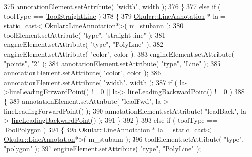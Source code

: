 \begin{DoxyCode}
375         annotationElement.setAttribute( \textcolor{stringliteral}{"width"}, width );
376     \}
377     \textcolor{keywordflow}{else} \textcolor{keywordflow}{if} ( toolType == \hyperlink{classEditAnnotToolDialog_ae4572c0cf4fc351cf03e4d86ef595a9ca28043180b87b79e0defc7b99eddb6c0d}{ToolStraightLine} )
378     \{
379         \hyperlink{classOkular_1_1LineAnnotation}{Okular::LineAnnotation} * la = \textcolor{keyword}{static\_cast<}
      \hyperlink{classOkular_1_1LineAnnotation}{Okular::LineAnnotation}*\textcolor{keyword}{>}( m\_stubann );
380         toolElement.setAttribute( \textcolor{stringliteral}{"type"}, \textcolor{stringliteral}{"straight-line"} );
381         engineElement.setAttribute( \textcolor{stringliteral}{"type"}, \textcolor{stringliteral}{"PolyLine"} );
382         engineElement.setAttribute( \textcolor{stringliteral}{"color"}, color );
383         engineElement.setAttribute( \textcolor{stringliteral}{"points"}, \textcolor{stringliteral}{"2"} );
384         annotationElement.setAttribute( \textcolor{stringliteral}{"type"}, \textcolor{stringliteral}{"Line"} );
385         annotationElement.setAttribute( \textcolor{stringliteral}{"color"}, color );
386         annotationElement.setAttribute( \textcolor{stringliteral}{"width"}, width );
387         \textcolor{keywordflow}{if} ( la->\hyperlink{classOkular_1_1LineAnnotation_a5ea35b2ee68172d9cf183d8778e34edb}{lineLeadingForwardPoint}() != 0 || la->
      \hyperlink{classOkular_1_1LineAnnotation_a6a492d6aadd6d9ee879f85c5f24e99a0}{lineLeadingBackwardPoint}() != 0 )
388         \{
389             annotationElement.setAttribute( \textcolor{stringliteral}{"leadFwd"}, la->
      \hyperlink{classOkular_1_1LineAnnotation_a5ea35b2ee68172d9cf183d8778e34edb}{lineLeadingForwardPoint}() );
390             annotationElement.setAttribute( \textcolor{stringliteral}{"leadBack"}, la->
      \hyperlink{classOkular_1_1LineAnnotation_a6a492d6aadd6d9ee879f85c5f24e99a0}{lineLeadingBackwardPoint}() );
391         \}
392     \}
393     \textcolor{keywordflow}{else} \textcolor{keywordflow}{if} ( toolType == \hyperlink{classEditAnnotToolDialog_ae4572c0cf4fc351cf03e4d86ef595a9ca671b22e9e16f80ad1e4c9fa2fb5cfba9}{ToolPolygon} )
394     \{
395         \hyperlink{classOkular_1_1LineAnnotation}{Okular::LineAnnotation} * la = \textcolor{keyword}{static\_cast<}
      \hyperlink{classOkular_1_1LineAnnotation}{Okular::LineAnnotation}*\textcolor{keyword}{>}( m\_stubann );
396         toolElement.setAttribute( \textcolor{stringliteral}{"type"}, \textcolor{stringliteral}{"polygon"} );
397         engineElement.setAttribute( \textcolor{stringliteral}{"type"}, \textcolor{stringliteral}{"PolyLine"} );

\end{DoxyCode}

